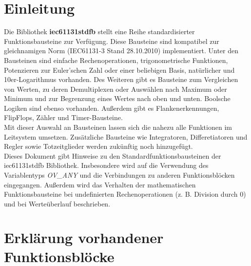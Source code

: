 \chapter{Einleitung}

Die Bibliothek \textbf{iec61131stdfb} stellt eine Reihe standardisierter Funktionsbausteine zur Verfügung. Diese Bausteine sind kompatibel zur gleichnamigen Norm (IEC61131-3 Stand 28.10.2010) implementiert. Unter den Bausteinen sind einfache Rechenoperationen, trigonometrische Funktionen, Potenzieren zur Euler'schen Zahl oder einer beliebigen Basis, natürlicher und 10er-Logarithmus vorhanden. Des Weiteren gibt es Bausteine zum Vergleichen von Werten, zu deren Demultiplexen oder Auswählen nach Maximum oder Minimum und zur Begrenzung eines Wertes nach oben und unten. Boolsche Logiken sind ebenso vorhanden. Außerdem gibt es Flankenerkennungen, FlipFlops, Zähler und Timer-Bausteine.\\
Mit dieser Auswahl an Bausteinen lassen sich die nahezu alle Funktionen im Leitsystem umsetzen. Zusätzliche Bausteine wie Integratoren, Differetiatoren und Regler sowie Totzeitglieder werden zukünftig noch hinzugefügt.\\

Dieses Dokument gibt Hinweise zu den Standardfunktionsbausteinen der iec61131stdfb Bibliothek. Insbesondere wird auf die Verwendung des Variablentyps \textit{OV\_ANY} und die Verbindungen zu anderen Funktionsblöcken eingegangen. Außerdem wird das Verhalten der mathematischen Funktionsbausteine bei undefinierten Rechenoperationen (z. B. Division durch 0) und bei Werteüberlauf beschrieben.\\






\chapter{Erklärung vorhandener Funktionsblöcke}

